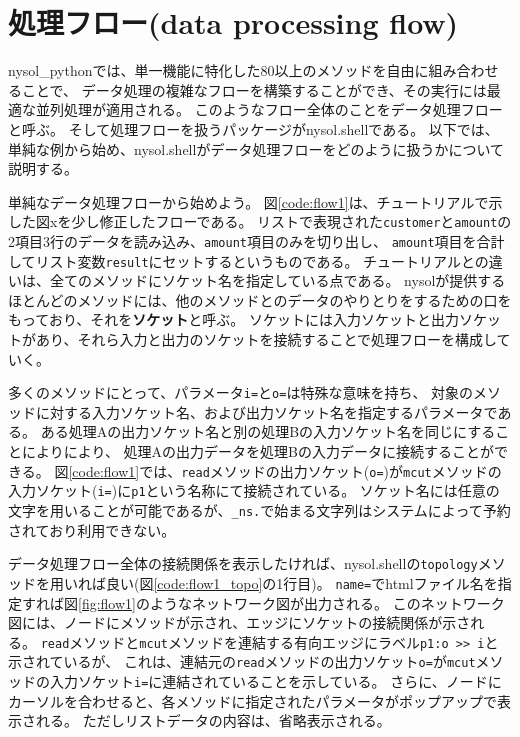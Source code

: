 
%

\section{処理フロー(data processing flow)\label{sect:csv}}
nysol\_pythonでは、単一機能に特化した80以上のメソッドを自由に組み合わせることで、
データ処理の複雑なフローを構築することができ、その実行には最適な並列処理が適用される。
このようなフロー全体のことをデータ処理フローと呼ぶ。
そして処理フローを扱うパッケージがnysol.shellである。
以下では、単純な例から始め、nysol.shellがデータ処理フローをどのように扱うかについて説明する。

単純なデータ処理フローから始めよう。
図\ref{code:flow1}は、チュートリアルで示した図xを少し修正したフローである。
リストで表現された\verb|customer|と\verb|amount|の2項目3行のデータを読み込み、\verb|amount|項目のみを切り出し、
\verb|amount|項目を合計してリスト変数\verb|result|にセットするというものである。
チュートリアルとの違いは、全てのメソッドにソケット名を指定している点である。
nysolが提供するほとんどのメソッドには、他のメソッドとのデータのやりとりをするための口をもっており、それを{\bf ソケット}と呼ぶ。
ソケットには入力ソケットと出力ソケットがあり、それら入力と出力のソケットを接続することで処理フローを構成していく。

多くのメソッドにとって、パラメータ\verb|i=|と\verb|o=|は特殊な意味を持ち、
対象のメソッドに対する入力ソケット名、および出力ソケット名を指定するパラメータである。
ある処理Aの出力ソケット名と別の処理Bの入力ソケット名を同じにすることによりにより、
処理Aの出力データを処理Bの入力データに接続することができる。
図\ref{code:flow1}では、\verb|read|メソッドの出力ソケット(\verb|o=|)が\verb|mcut|メソッドの
入力ソケット(\verb|i=|)に\verb|p1|という名称にて接続されている。
ソケット名には任意の文字を用いることが可能であるが、\verb|_ns.|で始まる文字列はシステムによって予約されており利用できない。

データ処理フロー全体の接続関係を表示したければ、nysol.shellの\verb|topology|メソッドを用いれば良い(図\ref{code:flow1_topo}の1行目)。
\verb|name=|でhtmlファイル名を指定すれば図\ref{fig:flow1}のようなネットワーク図が出力される。
このネットワーク図には、ノードにメソッドが示され、エッジにソケットの接続関係が示される。
\verb|read|メソッドと\verb|mcut|メソッドを連結する有向エッジにラベル\verb|p1:o >> i|と示されているが、
これは、連結元の\verb|read|メソッドの出力ソケット\verb|o=|が\verb|mcut|メソッドの入力ソケット\verb|i=|に連結されていることを示している。
さらに、ノードにカーソルを合わせると、各メソッドに指定されたパラメータがポップアップで表示される。
ただしリストデータの内容は、省略表示される。


